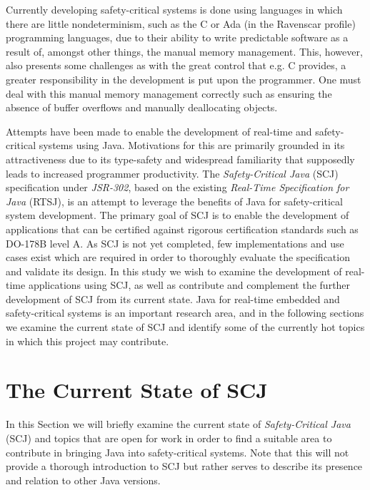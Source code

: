 Currently developing safety-critical systems is done using languages in which there are little nondeterminism, such as the C or Ada (in the Ravenscar profile) programming languages, due to their ability to write predictable software as a result of, amongst other things, the manual memory management. This, however, also presents some challenges as with the great control that e.g. C provides, a greater responsibility in the development is put upon the programmer. One must deal with this manual memory management correctly such as ensuring the absence of buffer overflows and manually deallocating objects.

Attempts have been made to enable the development of real-time and safety-critical systems using Java. Motivations for this are primarily grounded in its attractiveness due to its type-safety and widespread familiarity that supposedly leads to increased programmer productivity\cite{henties:2009-20, Nilsen96issuesin}.
The \textit{Safety-Critical Java} (SCJ) specification under \textit{JSR-302}\cite{JSR, SCJSpec}, based on the existing \textit{Real-Time Specification for Java} (RTSJ), is an attempt to leverage the benefits of Java for safety-critical system development. The primary goal of SCJ is to enable the development of applications that can be certified against rigorous certification standards such as DO-178B level A. As SCJ is not yet completed, few implementations and use cases exist which are required in order to thoroughly evaluate the specification and validate its design.
In this study we wish to examine the development of real-time applications using SCJ, as well as contribute and complement the further development of SCJ from its current state. Java for real-time embedded and safety-critical systems is an important research area, and in the following sections we examine the current state of SCJ and identify some of the currently hot topics in which this project may contribute.

\section{The Current State of SCJ}
In this Section we will briefly examine the current state of \textit{Safety-Critical Java} (SCJ) and topics that are open for work in order to find a suitable area to contribute in bringing Java into safety-critical systems. Note that this will not provide a thorough introduction to SCJ but rather serves to describe its presence and relation to other Java versions.

